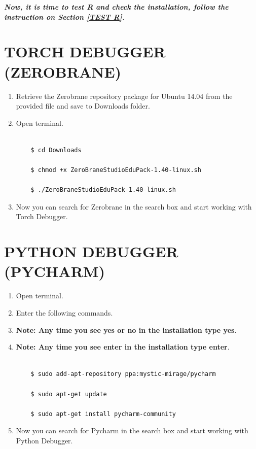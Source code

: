 \documentclass[12pt]{article}
\begin{document}
\textbf{\emph{Now, it is time to test R and check the installation, follow the instruction on Section \ref{TEST R}.}}

\newpage
\section{TORCH DEBUGGER (ZEROBRANE)}

\begin{enumerate}
  \item Retrieve the Zerobrane repository package for Ubuntu 14.04 from the provided file and save to Downloads folder.
  \item Open terminal.

\begin{lstlisting}

    $ cd Downloads

    $ chmod +x ZeroBraneStudioEduPack-1.40-linux.sh

    $ ./ZeroBraneStudioEduPack-1.40-linux.sh
\end{lstlisting}

   \item Now you can search for Zerobrane in the search box and start working with Torch Debugger.
\end{enumerate}
\newpage
\section{PYTHON DEBUGGER (PYCHARM)}

\begin{enumerate}
    \item Open terminal.
    \item Enter the following commands.
    \item \textbf{Note: Any time you see yes or no in the installation type yes}.
    \item \textbf{Note: Any time you see enter in the installation type enter}.


\begin{lstlisting}

    $ sudo add-apt-repository ppa:mystic-mirage/pycharm

    $ sudo apt-get update

    $ sudo apt-get install pycharm-community

\end{lstlisting}

   \item Now you can search for Pycharm in the search box and start working with Python Debugger.
\end{enumerate}
\newpage
\end{document}
